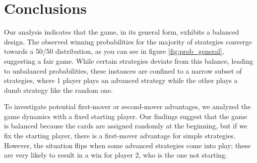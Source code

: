 \section{Conclusions} \label{section:Conclusions}
Our analysis indicates that the game, in its general form, exhibits a balanced design. The observed winning probabilities for the majority of strategies converge towards a 50/50 distribution, as you can see in figure \ref{fig:prob_general}, suggesting a fair game. While certain strategies deviate from this balance, leading to unbalanced probabilities, these instances are confined to a narrow subset of strategies, where 1 player plays an advanced strategy while the other plays a dumb strategy like the random one.

To investigate potential first-mover or second-mover advantages, we analyzed the game dynamics with a fixed starting player. Our findings suggest that the game is balanced because the cards are assigned randomly at the beginning, but if we fix the starting player, there is a first-mover advantage for simple strategies. However, the situation flips when some advanced strategies come into play; these are very likely to result in a win for player 2, who is the one not starting.